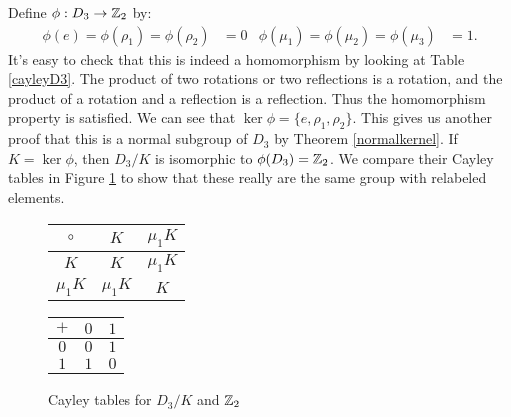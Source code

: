 \begin{example}
Define $\phi: D_3 \to \zn[2]$ by:
\begin{align*}
    \phi(e) = \phi(\rho_1) = \phi(\rho_2) &= 0 & \phi(\mu_1) = \phi(\mu_2) = \phi(\mu_3) &= 1.
\end{align*}
It's easy to check that this is indeed a homomorphism by looking at Table \ref{cayleyD3}. The product of two rotations or two reflections is a rotation, and the product of a rotation and a reflection is a reflection. Thus the homomorphism property is satisfied. We can see that $\ker \phi = \{e, \rho_1, \rho_2\}$. This gives us another proof that this is a normal subgroup of $D_3$ by Theorem \ref{normalkernel}. If $K = \ker\phi$, then $D_3/K$ is isomorphic to $\phi(D_3) = \zn[2]$. We compare their Cayley tables in Figure \ref{d3z2} to show that these really are the same group with relabeled elements.

\begin{figure}[ht]
\centering
\begin{tabular}{c | c c}
    $\circ$  & $K$ & $\mu_1K$ \\
    \hline
    $K$      & $K$ & $\mu_1K$ \\
    $\mu_1K$ & $\mu_1K$ & $K$
\end{tabular}
\quad
\begin{tabular}{c | c  c}
    $+$ & $0$ & $1$ \\
    \hline
    $0$ & $0$ & $1$ \\
    $1$ & $1$ & $0$
\end{tabular}
\caption{Cayley tables for $D_3/K$ and $\zn[2]$}
\label{d3z2}
\end{figure}

\end{example}
